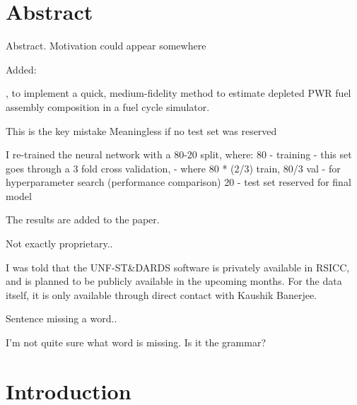 \documentclass[answers,11pt]{exam}
\begin{document}
\section*{Abstract}
\begin{questions}

        \question Abstract. Motivation could appear somewhere

        \begin{solution}
        	Added:
            
            , to implement a quick, medium-fidelity method to
            estimate depleted \gls{PWR} fuel assembly composition in a fuel
            cycle simulator.
        \end{solution}

        \question
        This is the key mistake Meaningless if no test set was reserved

        \begin{solution}
         I re-trained the neural network with a 80-20 split, where:
         80 - training
            - this set goes through a 3 fold cross validation,
            - where 80 * (2/3) train, 80/3 val
            - for hyperparameter search (performance comparison)
         20 - test set reserved for final model

         The results are added to the paper. 

        \end{solution}

        \quesiton
        Not exactly proprietary..

        \begin{solution}
        I was told that the UNF-ST\&DARDS software is privately available
        in RSICC, and is planned to be publicly available in the upcoming
        months. For the data itself, it is only available through direct
        contact with Kaushik Banerjee.
        \end{solution}

        \question
        Sentence missing a word..


        \begin{solution}
        I'm not quite sure what word is missing. Is it the grammar?
        \end{solution}

\section*{Introduction}


\end{questions}
\end{document}
